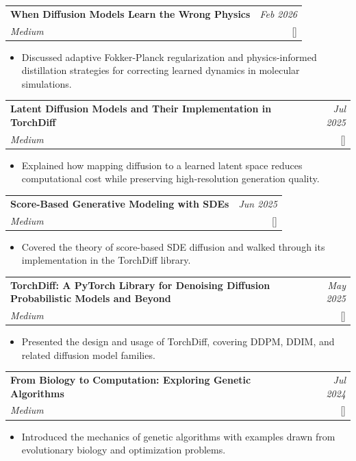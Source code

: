 \documentclass[a4paper,11pt]{article}
\makeatletter
\newcommand{\resumeProject}[4]{
\vspace{0.5mm}\item
    \begin{tabular*}{0.98\textwidth}[t]{l@{\extracolsep{\fill}}r}
        \textbf{#1} & \textit{\footnotesize{#3}} \\
        \footnotesize{\textit{#2}} & \footnotesize{#4}
    \end{tabular*}
    \vspace{-2.4mm}
}
\newcommand{\resumeItemListStart}{\begin{itemize}[leftmargin=*,labelsep=1mm,itemsep=0.5mm]}
\newcommand{\resumeItemListEnd}{\end{itemize}\vspace{-2mm}}
\makeatother
\begin{document}
\resumeProject
  {When Diffusion Models Learn the Wrong Physics}
  {Medium}
  {Feb 2026}
  {[\href{https://medium.com/@samaniloqman91/when-diffusion-models-learn-the-wrong-physics-fa66a8fea0f2}{\textcolor{darkblue}{\faMedium}}]}

\resumeItemListStart
  \item Discussed adaptive Fokker-Planck regularization and physics-informed distillation strategies for correcting learned dynamics in molecular simulations.
\resumeItemListEnd

\resumeProject
  {Latent Diffusion Models and Their Implementation in TorchDiff}
  {Medium}
  {Jul 2025}
  {[\href{https://medium.com/@samaniloqman91/latent-diffusion-models-and-their-implementation-in-torchdiff-7dc04c33c4f7}{\textcolor{darkblue}{\faMedium}}]}

\resumeItemListStart
  \item Explained how mapping diffusion to a learned latent space reduces computational cost while preserving high-resolution generation quality.
\resumeItemListEnd

\resumeProject
  {Score-Based Generative Modeling with SDEs}
  {Medium}
  {Jun 2025}
  {[\href{https://medium.com/@samaniloqman91/score-based-generative-modeling-with-sdes-theory-and-implementation-in-torchdiff-db9a20a84978}{\textcolor{darkblue}{\faMedium}}]}

\resumeItemListStart
  \item Covered the theory of score-based SDE diffusion and walked through its implementation in the TorchDiff library.
\resumeItemListEnd

\resumeProject
  {TorchDiff: A PyTorch Library for Denoising Diffusion Probabilistic Models and Beyond}
  {Medium}
  {May 2025}
  {[\href{https://medium.com/@samaniloqman91/torchdiff-a-pytorch-library-for-denoising-diffusion-probabilistic-models-and-beyond-d15156e9e3b5}{\textcolor{darkblue}{\faMedium}}]}

\resumeItemListStart
  \item Presented the design and usage of TorchDiff, covering DDPM, DDIM, and related diffusion model families.
\resumeItemListEnd

\resumeProject
  {From Biology to Computation: Exploring Genetic Algorithms}
  {Medium}
  {Jul 2024}
  {[\href{https://medium.com/@samaniloqman91/from-biology-to-computation-exploring-genetic-algorithms-5b090213351f}{\textcolor{darkblue}{\faMedium}}]}

\resumeItemListStart
  \item Introduced the mechanics of genetic algorithms with examples drawn from evolutionary biology and optimization problems.
\resumeItemListEnd
\end{document}
